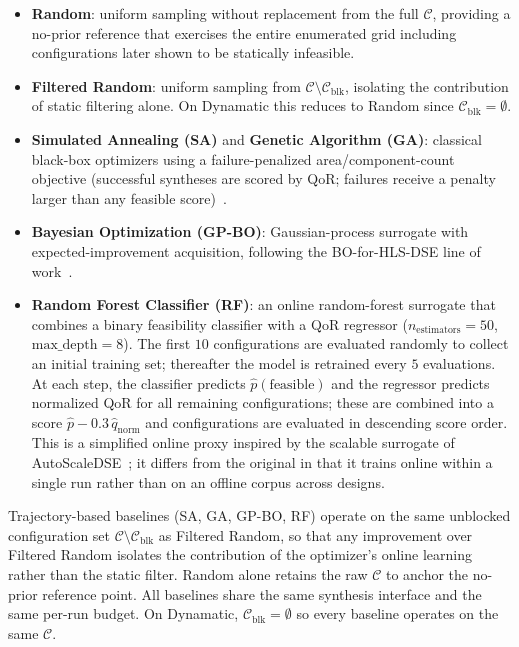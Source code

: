 \documentclass[journal]{IEEEtran}
\begin{document}
\begin{itemize}
    \item \textbf{Random}: uniform sampling without replacement from the full $\mathcal{C}$, providing a no-prior reference that exercises the entire enumerated grid including configurations later shown to be statically infeasible.
    \item \textbf{Filtered Random}: uniform sampling from $\mathcal{C} \setminus \mathcal{C}_{\text{blk}}$, isolating the contribution of static filtering alone. On Dynamatic this reduces to Random since $\mathcal{C}_{\text{blk}} = \emptyset$.
    \item \textbf{Simulated Annealing (SA)} and \textbf{Genetic Algorithm (GA)}: classical black-box optimizers using a failure-penalized area/component-count objective (successful syntheses are scored by QoR; failures receive a penalty larger than any feasible score)~\cite{ferretti2020cluster,liu2013learning}.
    \item \textbf{Bayesian Optimization (GP-BO)}: Gaussian-process surrogate with expected-improvement acquisition, following the BO-for-HLS-DSE line of work~\cite{snoek2012practical,ferretti2018lattice}.
    \item \textbf{Random Forest Classifier (RF)}: an online random-forest surrogate that combines a binary feasibility classifier with a QoR regressor ($n_{\text{estimators}}{=}50$, $\text{max\_depth}{=}8$). The first $10$ configurations are evaluated randomly to collect an initial training set; thereafter the model is retrained every $5$ evaluations. At each step, the classifier predicts $\hat{p}(\text{feasible})$ and the regressor predicts normalized QoR for all remaining configurations; these are combined into a score $\hat{p} - 0.3\,\hat{q}_{\text{norm}}$ and configurations are evaluated in descending score order. This is a simplified online proxy inspired by the scalable surrogate of AutoScaleDSE~\cite{sohrabizadeh2023autoscaledse}; it differs from the original in that it trains online within a single run rather than on an offline corpus across designs.
\end{itemize}

Trajectory-based baselines (SA, GA, GP-BO, RF) operate on the same unblocked configuration set $\mathcal{C} \setminus \mathcal{C}_{\text{blk}}$ as Filtered Random, so that any improvement over Filtered Random isolates the contribution of the optimizer's online learning rather than the static filter. Random alone retains the raw $\mathcal{C}$ to anchor the no-prior reference point. All baselines share the same synthesis interface and the same per-run budget. On Dynamatic, $\mathcal{C}_{\text{blk}} = \emptyset$ so every baseline operates on the same $\mathcal{C}$.
\end{document}

